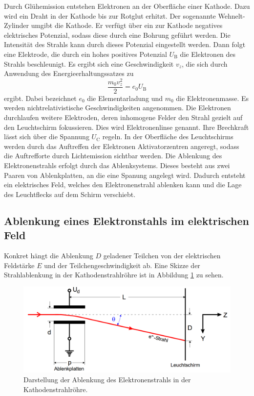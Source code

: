 Durch Glühemission entstehen Elektronen an der Oberfläche einer Kathode. Dazu
wird ein Draht in der Kathode bis zur Rotglut erhitzt. Der sogenannte Wehnelt-Zylinder
umgibt die Kathode. Er verfügt über ein zur Kathode negatives elektrisches Potenzial, sodass diese durch eine Bohrung geführt werden. Die Intensität
des Strahls kann durch dieses Potenzial eingestellt werden.
Dann folgt eine Elektrode, die durch ein hohes positives Potenzial $U_\text{B}$
die Elektronen des Strahls beschleunigt. Es ergibt sich eine Geschwindigkeit $v_z$,
die sich durch Anwendung des Energieerhaltungssatzes zu
\begin{equation}
  \frac{m_0 v_z^2}{2} = e_0 U_\text{B}
  \label{eqn:energie}
\end{equation}
ergibt. Dabei bezeichnet $e_0$ die Elementarladung und $m_0$ die Elektronenmasse.
Es werden nichtrelativistische Geschwindigkeiten angenommen.
Die Elektronen durchlaufen weitere Elektroden, deren inhomogene Felder den Strahl
gezielt auf den Leuchtschirm fokussieren. Dies wird Elektronenlinse genannt. Ihre
Brechkraft lässt sich über die Spannung $U_\text{C}$ regeln. In der Oberfläche des Leuchtschirms
werden durch das Auftreffen der Elektronen Aktivatorzentren angeregt, sodass die
Auftrefforte durch Lichtemission sichtbar werden.
Die Ablenkung des Elektronenstrahls erfolgt durch das Ablenksystems. Dieses besteht aus
zwei Paaren von Ablenkplatten, an die eine Spanung angelegt wird. Dadurch entsteht ein elektrisches
Feld, welches den Elektronenstrahl ablenken kann und die Lage des Leuchtflecks auf
dem Schirm verschiebt.

\subsection{Ablenkung eines Elektronstahls im elektrischen Feld}
\label{subsec:Ablenkungtheorie}
Konkret hängt die Ablenkung $D$ geladener Teilchen von der elektrischen Feldstärke $E$
und der Teilchengeschwindigkeit ab.
Eine Skizze der Strahlablenkung in der Kathodenstrahlröhre ist in Abbildung \ref{fig:ablenkungtheorie}
zu sehen.

\begin{figure}[H]
  \centering
  \includegraphics[width=350pt]{data/strahlablenkung.png}
  \caption{Darstellung der Ablenkung des Elektronenstrahls in der Kathodenstrahlröhre.\cite{Versuchsanleitung501}}
  \label{fig:ablenkungtheorie}
\end{figure}

